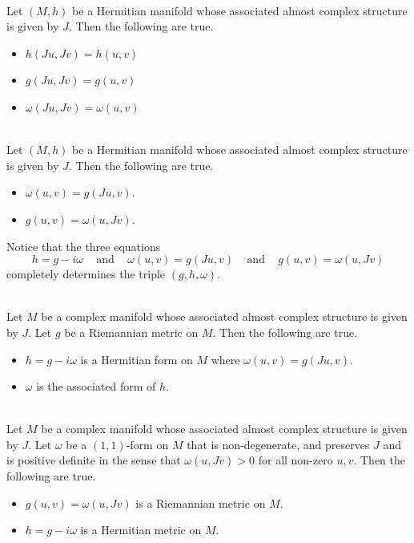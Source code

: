 \documentclass[a4paper]{article}
\begin{document}
\begin{prp}{}{}\\
Let $(M,h)$ be a Hermitian manifold whose associated almost complex structure is given by $J$. Then the following are true. 
\begin{itemize}
\item $h(Ju,Jv)=h(u,v)$
\item $g(Ju,Jv)=g(u,v)$
\item $\omega(Ju,Jv)=\omega(u,v)$
\end{itemize}
\end{prp}

\begin{prp}{}{}\\
Let $(M,h)$ be a Hermitian manifold whose associated almost complex structure is given by $J$. Then the following are true. 
\begin{itemize}
\item $\omega(u,v)=g(Ju,v)$. 
\item $g(u,v)=\omega(u,Jv)$. 
\end{itemize}
\end{prp}

Notice that the three equations $$h=g-i\omega\;\;\;\text{ and }\;\;\;\omega(u,v)=g(Ju,v)\;\;\;\text{ and }\;\;\;g(u,v)=\omega(u,Jv)$$ completely determines the triple $(g,h,\omega)$. 

\begin{prp}{}{}\\
Let $M$ be a complex manifold whose associated almost complex structure is given by $J$. Let $g$ be a Riemannian metric on $M$. Then the following are true. 
\begin{itemize}
\item $h=g-i\omega$ is a Hermitian form on $M$ where $\omega(u,v)=g(Ju,v)$. 
\item $\omega$ is the associated form of $h$. 
\end{itemize}
\end{prp}

\begin{prp}{}{}\\
Let $M$ be a complex manifold whose associated almost complex structure is given by $J$. Let $\omega$ be a $(1,1)$-form on $M$ that is non-degenerate, and preserves $J$ and is positive definite in the sense that $\omega(u,Jv)>0$ for all non-zero $u,v$. Then the following are true. 
\begin{itemize}
\item $g(u,v)=\omega(u,Jv)$ is a Riemannian metric on $M$. 
\item $h=g-i\omega$ is a Hermitian metric on $M$. 
\end{itemize}
\end{prp}
\end{document}
